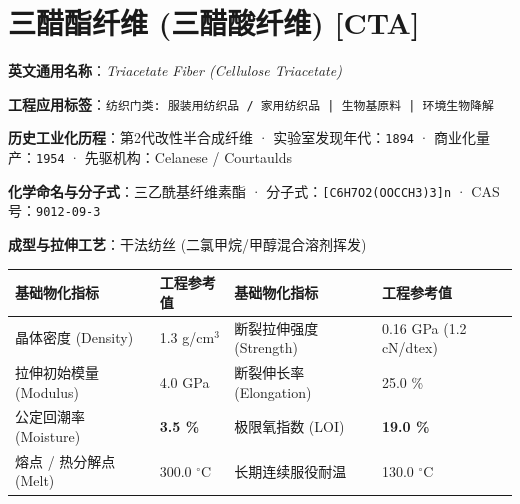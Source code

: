 \documentclass[11pt,openright,twoside,UTF8]{ctexbook}
\begin{document}
\section{三醋酯纤维 (三醋酸纤维) [CTA]}
\label{sec:cta}

\noindent\textbf{英文通用名称}：\textit{Triacetate Fiber (Cellulose Triacetate)}\par
\noindent\textbf{工程应用标签}：\texttt{纺织门类: 服装用纺织品 / 家用纺织品 | 生物基原料 | 环境生物降解}\par
\noindent\textbf{历史工业化历程}：第2代改性半合成纤维 · 实验室发现年代：\texttt{1894} · 商业化量产：\texttt{1954} · 先驱机构：Celanese / Courtaulds\par
\noindent\textbf{化学命名与分子式}：三乙酰基纤维素酯 · 分子式：\texttt{[C6H7O2(OOCCH3)3]n} · CAS 号：\texttt{9012-09-3}\par
\noindent\textbf{成型与拉伸工艺}：干法纺丝 (二氯甲烷/甲醇混合溶剂挥发)\par

\vspace{0.15cm}
\begin{center}
\small
\begin{tabularx}{\textwidth}{p{3.8cm}Xp{3.8cm}X}
\toprule
\textbf{基础物化指标} & \textbf{工程参考值} & \textbf{基础物化指标} & \textbf{工程参考值} \\
\midrule
晶体密度 (Density) & 1.3 g/cm$^3$ & 断裂拉伸强度 (Strength) & 0.16 GPa (1.2 cN/dtex) \\
拉伸初始模量 (Modulus) & 4.0 GPa & 断裂伸长率 (Elongation) & 25.0 \% \\
公定回潮率 (Moisture) & \textbf{3.5 \%} & 极限氧指数 (LOI) & \textbf{19.0 \%} \\
熔点 / 热分解点 (Melt) & 300.0 $^\circ\mathrm{C}$ & 长期连续服役耐温 & 130.0 $^\circ\mathrm{C}$ \\
\bottomrule
\end{tabularx}
\end{center}
\vspace{0.15cm}
\end{document}
